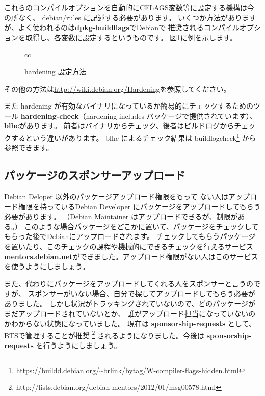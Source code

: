 \documentclass[mingoth,a4paper]{jsarticle}
\begin{document}
これらのコンパイルオプションを自動的にCFLAGS変数等に設定する機構は今の所なく、
debian/rules に記述する必要があります。
いくつか方法がありますが、よく使われるのは{\bf dpkg-buildflags}でDebianで
推奨されるコンパイルオプションを取得し、各変数に設定するというものです。
図\ref{fig:hardening_setting}に例を示します。

\begin{figure}[h]
\begin{tabular}{cc}
\end{tabular}
\caption{hardening 設定方法}
\label{fig:hardening_setting}
\end{figure}

その他の方法は\url{http://wiki.debian.org/Hardening}を参照してください。

また hardening が有効なバイナリになっているか簡易的にチェックするためのツール
{\bf hardening-check}（hardening-includes パッケージで提供されています）、{\bf blhc}があります。
前者はバイナリからチェック、後者はビルドログからチェックするという違いがあります。
blhc によるチェック結果は buildlogcheck\footnote{\url{https://buildd.debian.org/~brlink/bytag/W-compiler-flags-hidden.html}}
から参照できます。

\subsection{パッケージのスポンサーアップロード}
\enlargethispage{6mm}

Debian Deloper 以外のパッケージアップロード権限をもって
ない人はアップロード権限を持っているDebian Developer にパッケージをアップロードしてもらう必要があります。
（Debian Maintainer はアップロードできるが、制限がある。）
このような場合パッケージをどこかに置いて、パッケージをチェックしてもらった後でDebianにアップロードされます。
チェックしてもらうパッケージを置いたり、このチェックの課程や機械的にできるチェックを行えるサービス
{\bf mentors.debian.net}ができました。アップロード権限がない人はこのサービスを使うようにしましょう。

また、代わりにパッケージをアップロードしてくれる人をスポンサーと言うのですが、
スポンサーがいない場合、自分で探してアップロードしてもらう必要がありました。
しかし状況がトラッキングされていないので、どのパッケージがまだアップロードされていないとか、
誰がアップロード担当になっていないのかわからない状態になっていました。
現在は {\bf sponsorship-requests} として、BTSで管理することが推奨
\footnote{http://lists.debian.org/debian-mentors/2012/01/msg00578.html}
されるようになりました。今後は {\bf sponsorship-requests} を行うようにしましょう。
\end{document}

